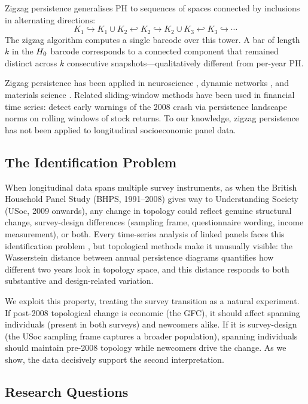Zigzag persistence \citep{carlsson2010zigzag} generalises PH to sequences of
spaces connected by inclusions in alternating directions:
\[
  K_1 \hookrightarrow K_1 \cup K_2 \hookleftarrow K_2
       \hookrightarrow K_2 \cup K_3 \hookleftarrow K_3
       \hookrightarrow \cdots
\]
The zigzag algorithm computes a single barcode over this tower.
A bar of length $k$ in the $H_{0}$ barcode corresponds to a connected component
that remained distinct across $k$ consecutive snapshots---qualitatively different
from per-year PH.

Zigzag persistence has been applied in neuroscience
\citep{bendich2016persistent}, dynamic networks \citep{kim2021analysis}, and
materials science \citep{townsend2020representation}.
Related sliding-window methods have been used in financial time series:
\citet{gidea2018topological} detect early warnings of the 2008 crash via
persistence landscape norms on rolling windows of stock returns.
To our knowledge, zigzag persistence has not been applied to longitudinal
socioeconomic panel data.

\subsection{The Identification Problem}

When longitudinal data spans multiple survey instruments, as when the British
Household Panel Study (BHPS, 1991--2008) gives way to Understanding Society
(USoc, 2009 onwards), any change in topology could reflect genuine structural
change, survey-design differences (sampling frame, questionnaire wording, income
measurement), or both.
Every time-series analysis of linked panels faces this identification problem
\citep{lynn2009methodology}, but topological methods make it unusually visible:
the Wasserstein distance between annual persistence diagrams quantifies how
different two years look in topology space, and this distance responds to both
substantive and design-related variation.

We exploit this property, treating the survey transition as a natural experiment.
If post-2008 topological change is economic (the GFC), it should affect spanning
individuals (present in both surveys) and newcomers alike.
If it is survey-design (the USoc sampling frame captures a broader population),
spanning individuals should maintain pre-2008 topology while newcomers drive the
change.
As we show, the data decisively support the second interpretation.

\subsection{Research Questions}

